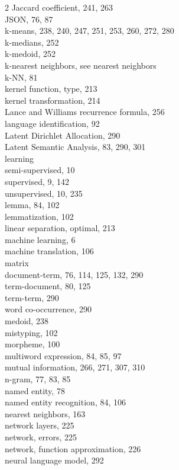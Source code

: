 \documentclass[11pt,openany,executivepaper]{book}
\begin{document}
\begin{multicols}{2}
Jaccard coefficient, 241, 263\\
JSON, 76, 87\\
k-means, 238, 240, 247, 251, 253, 260, 272, 280\\
k-medians, 252\\
k-medoid, 252\\
k-nearest neighbors, see nearest neighbors\\
k-NN, 81\\
kernel function, type, 213\\
kernel transformation, 214\\
Lance and Williams recurrence formula, 256\\
language identification, 92\\
Latent Dirichlet Allocation, 290\\
Latent Semantic Analysis, 83, 290, 301\\
learning\\
semi-supervised, 10\\
supervised, 9, 142\\
unsupervised, 10, 235\\
lemma, 84, 102\\
lemmatization, 102\\
linear separation, optimal, 213\\
machine learning, 6\\
machine translation, 106\\
matrix\\
document-term, 76, 114, 125, 132, 290\\
term-document, 80, 125\\
term-term, 290\\
word co-occurrence, 290\\
medoid, 238\\
mistyping, 102\\
morpheme, 100\\
multiword expression, 84, 85, 97\\
mutual information, 266, 271, 307, 310\\
n-gram, 77, 83, 85\\
named entity, 78\\
named entity recognition, 84, 106\\
nearest neighbors, 163\\
network layers, 225\\
network, errors, 225\\
network, function approximation, 226\\
neural language model, 292\\

\end{multicols}
\end{document}
